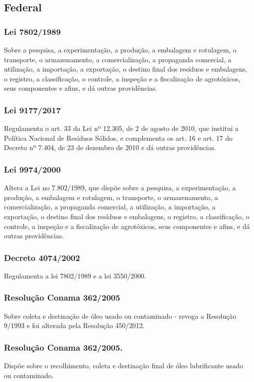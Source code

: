 \begin{subapend}
	\subsection{Federal}
	\begin{subsubapend}
		\subsubsection{Lei 7802/1989}
		Sobre a pesquisa, a experimentação, a produção, a embalagem e rotulagem, o transporte, o armazenamento, a comercialização, a propaganda comercial, a utilização, a importação, a exportação, o destino final dos resíduos e embalagens, o registro, a classificação, o controle, a inspeção e a fiscalização de agrotóxicos, seus componentes e afins, e dá outras providências.
		\subsubsection{Lei 9177/2017}
		Regulamenta o art. 33 da Lei nº 12.305, de 2 de agosto de 2010, que institui a Política Nacional de Resíduos Sólidos, e complementa os art. 16 e art. 17 do Decreto nº 7.404, de 23 de dezembro de 2010 e dá outras providências.
		\subsubsection{Lei 9974/2000}
		Altera a Lei no 7.802/1989, que dispõe sobre a pesquisa, a experimentação, a produção, a embalagem e rotulagem, o transporte, o armazenamento, a comercialização, a propaganda comercial, a utilização, a importação, a exportação, o destino final dos resíduos e embalagens, o registro, a classificação, o controle, a inspeção e a fiscalização de agrotóxicos, seus componentes e afins, e dá outras providências.
		\subsubsection{Decreto 4074/2002}
		Regulamenta a lei 7802/1989 e a lei 3550/2000.
		\subsubsection{Resolução Conama 362/2005}
		Sobre coleta e destinação de óleo usado ou contaminado - revoga a Resolução 9/1993 e foi alterada pela Resolução 450/2012.
		\subsubsection{Resolução Conama 362/2005.}
		Dispõe sobre o recolhimento, coleta e destinação final de óleo lubrificante usado ou contaminado.

\end{subsubapend}
\end{subapend}
